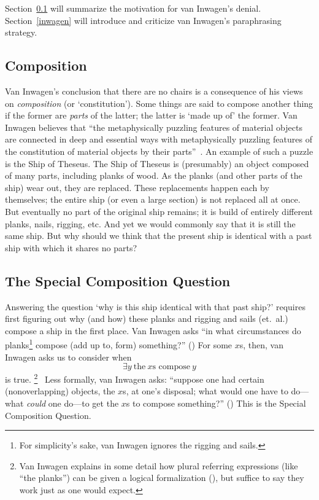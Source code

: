 \documentclass[11pt]{standalone}
\begin{document}
\begin{spacing}{1.5}
Section~\ref{comp} will summarize the motivation for van Inwagen's
denial.  Section~\ref{inwagen} will introduce and criticize van
Inwagen's paraphrasing strategy.

\subsection{Composition}
\label{comp}
Van Inwagen's conclusion that there are no chairs is a consequence of
his views on {\em composition} (or `constitution').  Some things are
said to compose another thing if the former are {\em parts} of the
latter; the latter is `made up of' the former.  Van Inwagen believes
that ``the metaphysically puzzling features of material objects are
connected in deep and essential ways with metaphysically puzzling
features of the constitution of material objects by their
parts''~\citep[18]{inwagen1995}.  An example of such a puzzle is the
Ship of Theseus.  The Ship of Theseus is (presumably) an object
composed of many parts, including planks of wood.  As the planks (and
other parts of the ship) wear out, they are replaced.  These
replacements happen each by themselves; the entire ship (or even a
large section) is not replaced all at once.  But eventually no part of
the original ship remains; it is build of entirely different planks,
nails, rigging, etc.  And yet we would commonly say that it is still
the same ship.  But why should we think that the present ship is
identical with a past ship with which it shares no parts?

\subsection{The Special Composition Question}
\label{scq}
Answering the question `why is this ship identical with that past
ship?' requires first figuring out why (and how) these planks and
rigging and sails (et.\ al.) compose a ship in the first place.  Van
Inwagen asks ``in what circumstances do planks\footnote{For
  simplicity's sake, van Inwagen ignores the rigging and sails.}
compose (add up to, form) something?'' (\citeyear[21]{inwagen1995}) 
For some $x$s, then, van Inwagen asks us to consider when
\begin{equation}
\exists y\ \text{the}\ x\text{s compose}\ y
\end{equation}
is true.%
\footnote{Van Inwagen explains in some detail how plural referring
  expressions (like ``the planks'') can be given a logical
  formalization (\citeyear[23--28]{inwagen1995}), but suffice to say
  they work just as one would expect.}
%
\ Less formally, van Inwagen asks: ``suppose one had certain
(nonoverlapping) objects, the $x$s, at one's disposal; what would one
have to do---what {\em could} one do---to get the $x$s to compose
something?'' (\citeyear[31]{inwagen1995})  This is the Special
Composition Question.


\end{spacing}
\end{document}
